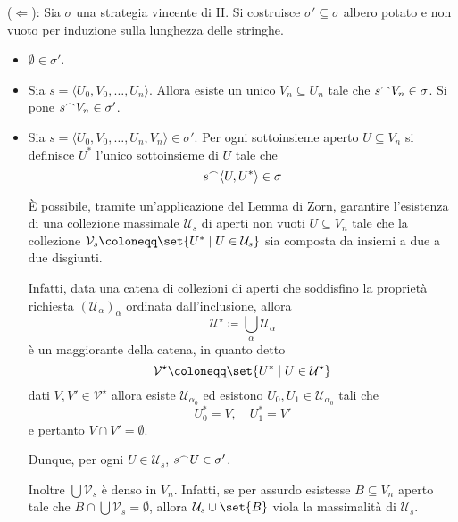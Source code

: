 \documentclass{article}
\newcommand{\1}{\mathds{1}}
\newcommand{\concat}{\null^{\frown}} %
\begin{document}
(\(\Leftarrow\)): Sia \(\sigma\) una strategia vincente di II. Si costruisce \(\sigma' \subseteq \sigma\) albero potato e non vuoto per induzione sulla lunghezza delle stringhe.
\begin{itemize}
\item \(\emptyset \in \sigma'\).
\item Sia \(s=\langle U_{0},V_{0},\dots,U_{n}\rangle\). Allora esiste un unico \(V_{n} \subseteq U_{n}\) tale che \(s\concat V_{n} \in \sigma\). Si pone \(s\concat V_{n} \in \sigma'\).
\item Sia \(s = \langle U_{0},V_{0},\dots, U_{n}, V_{n}\rangle \in \sigma'\). Per ogni sottoinsieme aperto \(U \subseteq V_{n}\) si definisce \(U^{*}\) l'unico sottoinsieme di \(U\) tale che
\begin{equation*}
  s\concat \langle U,U^{*}\rangle \in \sigma
\end{equation*}

È possibile, tramite un'applicazione del Lemma di Zorn, garantire l'esistenza di una collezione massimale \(\mathcal{U}_{s}\) di aperti non vuoti \(U \subseteq V_{n}\) tale che la collezione \(\mathcal{V}_{s} \coloneqq \set{U^{*}\mid U \in \mathcal{U}_{s}}\) sia composta da insiemi a due a due disgiunti.

Infatti, data una catena di collezioni di aperti che soddisfino la proprietà richiesta \((\mathcal{U}_{\alpha})_{\alpha}\) ordinata dall'inclusione, allora
\begin{equation*}
\mathcal{U}^{\star}\coloneqq \bigcup_{\alpha} \mathcal{U}_{\alpha}
\end{equation*}
è un maggiorante della catena, in quanto detto
\begin{equation*}
\mathcal{V}^{\star} \coloneqq \set{U^{*}\mid U \in \mathcal{U}^{\star}}
\end{equation*}
dati \(V,V' \in \mathcal{V}^{\star}\) allora esiste \(\mathcal{U}_{\alpha_{0}}\) ed esistono \(U_{0},U_{1} \in \mathcal{U}_{\alpha_{0}}\) tali che
\begin{equation*}
U_{0}^{*}=V,\quad U_{1}^{*} = V'
\end{equation*}
e pertanto \(V\cap V' =\emptyset\).

Dunque, per ogni \(U \in \mathcal{U}_{s}\), \(s\concat U \in \sigma'\).

Inoltre \(\bigcup \mathcal{V}_{s}\) è denso in \(V_{n}\). Infatti, se per assurdo esistesse \(B \subseteq V_{n}\) aperto tale che \(B\cap \bigcup \mathcal{V}_{s} = \emptyset\), allora \(\mathcal{U}_{s}\cup \set{B}\) viola la massimalità di \(\mathcal{U}_{s}\).
\end{itemize}
\end{document}

